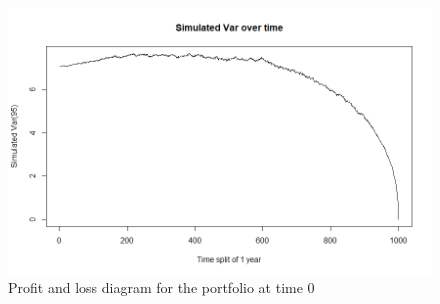 \documentclass{beamer}
\begin{document}
\begin{frame}
    \begin{figure}[!ht]
        \centering
        \caption{Profit and loss diagram for the portfolio
                at time 0}
        \label{fig:var}
        \includegraphics[scale=0.35]{var_sim.png}
     \end{figure}
\end{frame}
\end{document}
